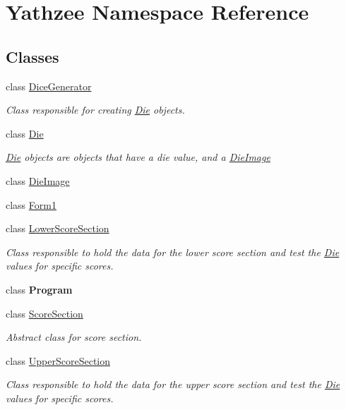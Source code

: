 \hypertarget{namespace_yathzee}{}\section{Yathzee Namespace Reference}
\label{namespace_yathzee}
\subsection*{Classes}
\begin{DoxyCompactItemize}
\item 
class \hyperlink{class_yathzee_1_1_dice_generator}{Dice\+Generator}
\begin{DoxyCompactList}\small\item\em Class responsible for creating \hyperlink{class_yathzee_1_1_die}{Die} objects. \end{DoxyCompactList}\item 
class \hyperlink{class_yathzee_1_1_die}{Die}
\begin{DoxyCompactList}\small\item\em \hyperlink{class_yathzee_1_1_die}{Die} objects are objects that have a die value, and a \hyperlink{class_yathzee_1_1_die_image}{Die\+Image} \end{DoxyCompactList}\item 
class \hyperlink{class_yathzee_1_1_die_image}{Die\+Image}
\item 
class \hyperlink{class_yathzee_1_1_form1}{Form1}
\item 
class \hyperlink{class_yathzee_1_1_lower_score_section}{Lower\+Score\+Section}
\begin{DoxyCompactList}\small\item\em Class responsible to hold the data for the lower score section and test the \hyperlink{class_yathzee_1_1_die}{Die} values for specific scores. \end{DoxyCompactList}\item 
class {\bfseries Program}
\item 
class \hyperlink{class_yathzee_1_1_score_section}{Score\+Section}
\begin{DoxyCompactList}\small\item\em Abstract class for score section. \end{DoxyCompactList}\item 
class \hyperlink{class_yathzee_1_1_upper_score_section}{Upper\+Score\+Section}
\begin{DoxyCompactList}\small\item\em Class responsible to hold the data for the upper score section and test the \hyperlink{class_yathzee_1_1_die}{Die} values for specific scores. \end{DoxyCompactList}\end{DoxyCompactItemize}
